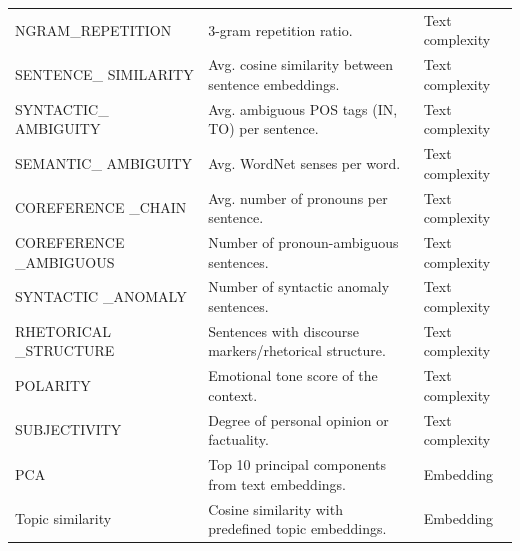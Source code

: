 \documentclass[11pt]{article}
\begin{document}
\begin{table}[htbp]
{\begin{tabular}{|p{4cm}|p{5cm}|p{3cm}|}
NGRAM\_REPETITION & 3-gram repetition ratio. & Text complexity \\
SENTENCE\_ SIMILARITY & Avg. cosine similarity between sentence embeddings. & Text complexity \\
SYNTACTIC\_ AMBIGUITY & Avg. ambiguous POS tags (IN, TO) per sentence. & Text complexity \\
SEMANTIC\_ AMBIGUITY & Avg. WordNet senses per word. & Text complexity \\
COREFERENCE \_CHAIN & Avg. number of pronouns per sentence. & Text complexity \\
COREFERENCE \_AMBIGUOUS & Number of pronoun-ambiguous sentences. & Text complexity \\
SYNTACTIC \_ANOMALY & Number of syntactic anomaly sentences. & Text complexity \\
RHETORICAL \_STRUCTURE & Sentences with discourse markers/rhetorical structure. & Text complexity \\
POLARITY & Emotional tone score of the context. & Text complexity \\
SUBJECTIVITY & Degree of personal opinion or factuality. & Text complexity \\
PCA & Top 10 principal components from text embeddings. & Embedding \\
Topic similarity & Cosine similarity with predefined topic embeddings. & Embedding \\
\hline
\end{tabular}
}
\end{table}
\end{document}
